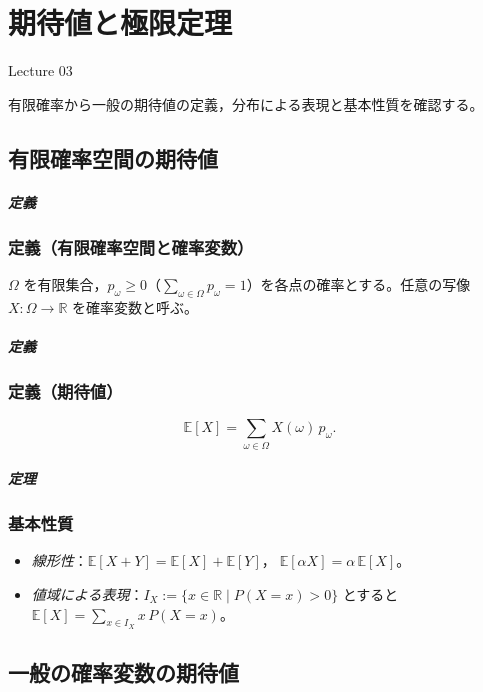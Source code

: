 \documentclass[uplatex,dvipdfmx,11pt,a4paper,openany]{bxjsbook}
\begin{document}
\chapter{期待値と極限定理}
Lecture 03

有限確率から一般の期待値の定義，分布による表現と基本性質を確認する。

\section{有限確率空間の期待値}
\paragraph{定義}
\subsection{定義（有限確率空間と確率変数）}
$\Omega$ を有限集合，$p_\omega\ge0$（$\sum_{\omega\in\Omega} p_\omega=1$）を各点の確率とする。任意の写像 $X\colon \Omega\to\mathbb{R}$ を確率変数と呼ぶ。


\paragraph{定義}
\subsection{定義（期待値）}
\[\mathbb{E}[X]=\sum_{\omega\in\Omega} X(\omega)\,p_\omega.\]


\paragraph{定理}
\subsection{基本性質}
\begin{itemize}
\item \emph{線形性}：$\mathbb{E}[X+Y]=\mathbb{E}[X]+\mathbb{E}[Y]$，$\;\mathbb{E}[\alpha X]=\alpha\,\mathbb{E}[X]$。
\item \emph{値域による表現}：$I_X:=\{x\in\mathbb{R}\mid P(X=x)>0\}$ とすると $\displaystyle \mathbb{E}[X]=\sum_{x\in I_X} x\,P(X=x)$。
\end{itemize}


\section{一般の確率変数の期待値}
\end{document}
